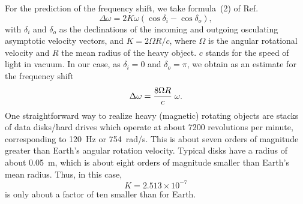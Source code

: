\documentclass[prl,preprint,amsfonts,showpacs,showkeys]{revtex4}
\begin{document}
For the prediction of the frequency shift, we take formula~(2) of Ref.~\cite{anderson:091102}
$$
\Delta \omega = 2K\omega (\cos \delta_i -\cos \delta_o),
$$
with $\delta_i$ and $\delta_o$ as the declinations of the incoming and outgoing osculating asymptotic velocity vectors,
and $K= 2\Omega R /c$, where $\Omega$ is the angular rotational velocity and $R$ the mean radius of the heavy object. $c$ stands for the speed of light in vacuum.
In our case, as $\delta_i =0$ and $\delta_o = \pi$, we obtain as an estimate for the frequency shift
\begin{equation}
\Delta \omega = {8\Omega R\over c}\;\omega .
\end{equation}
One straightforward way to realize heavy (magnetic) rotating objects are stacks of data disks/hard drives which operate at about 7200 revolutions per minute, corresponding to 120~Hz or 754~rad/s.
This is about seven orders of magnitude greater than Earth's angular rotation velocity.
Typical disks have a radius of about 0.05~m, which is about eight orders of magnitude smaller than Earth's mean radius.
Thus, in this case,
\begin{equation}
K= 2.513\times 10^{-7}
\end{equation}
is only about a factor of ten smaller than for Earth.
\end{document}
